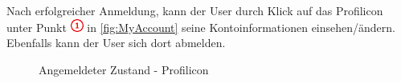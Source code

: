 \documentclass[11pt,ngerman]{article}
\begin{document}
    \noindent Nach erfolgreicher Anmeldung, kann der User durch Klick auf das Profilicon unter Punkt \includegraphics{figures/1.png} in \autoref{fig:MyAccount} seine Kontoinformationen einsehen/ändern. Ebenfalls kann der User sich dort abmelden.

    \begin{figure}[H]
    	\centering
    	\caption{Angemeldeter Zustand - Profilicon}
    	\label{fig:MyAccount}
    \end{figure}
\end{document}
